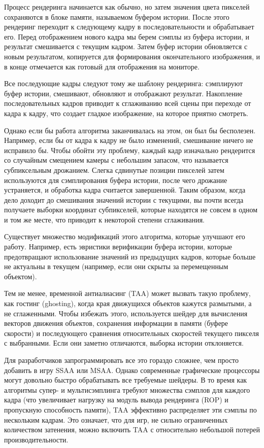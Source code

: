 Процесс рендеринга начинается как обычно, но затем значения цвета пикселей сохраняются в блоке памяти, называемом буфером истории. После этого рендеринг переходит к следующему кадру в последовательности и обрабатывает его. Перед отображением нового кадра мы берем сэмплы из буфера истории, и результат смешивается с текущим кадром. Затем буфер истории обновляется с новым результатом, копируется для формирования окончательного изображения, и в конце отмечается как готовый для отображения на мониторе.

Все последующие кадры следуют тому же шаблону рендеринга: сэмплируют буфер истории, смешивают, обновляют и отображают результат. Накопление последовательных кадров приводит к сглаживанию всей сцены при переходе от кадра к кадру, что создает гладкое изображение, на которое приятно смотреть.

Однако если бы работа алгоритма заканчивалась на этом, он был бы бесполезен. Например, если бы от кадра к кадру не было изменений, смешивание ничего не исправило бы. Чтобы обойти эту проблему, каждый кадр изначально рендерится со случайным смещением камеры с небольшим запасом, что называется субпиксельным дрожанием. Слегка сдвинутые позиции пикселей затем используются для сэмплирования буфера истории, после чего дрожание устраняется, и обработка кадра считается завершенной. Таким образом, когда дело доходит до смешивания значений истории с текущими, вы почти всегда получаете выборки координат субпикселей, которые находятся не совсем в одном и том же месте, что приводит к некоторой степени сглаживания.

Существует множество модификаций этого алгоритма, которые улучшают его работу. Например, есть эвристики верификации буфера истории, которые предотвращают использование значений из предыдущих кадров, которые больше не актуальны в текущем (например, если они скрыты за перемещенным объектом).

Тем не менее, временной антиалиасинг (TAA) может вызвать такую проблему, как гостинг (ghosting), когда края движущихся объектов кажутся размытыми, а не сглаженными. Чтобы избежать этого, используется шейдер для вычисления векторов движения объектов, сохранения информации в памяти (буфере скорости) и последующего сравнения относительных скоростей текущего пикселя с выбранными. Если они заметно отличаются, выборка истории отклоняется.

Для разработчиков запрограммировать все это гораздо сложнее, чем просто добавить в игру SSAA или MSAA. Однако современные графические процессоры могут довольно быстро обрабатывать все требуемые шейдеры. В то время как алгоритмы супер- и мультисэмплинга требуют множества сэмплов для каждого кадра (что увеличивает нагрузку на модуль вывода рендеринга (ROP) и пропускную способность памяти), TAA эффективно распределяет эти сэмплы по нескольким кадрам. Это означает, что для игр, не сильно ограниченных количеством затенения, можно включить TAA с относительно небольшой потерей производительности.

